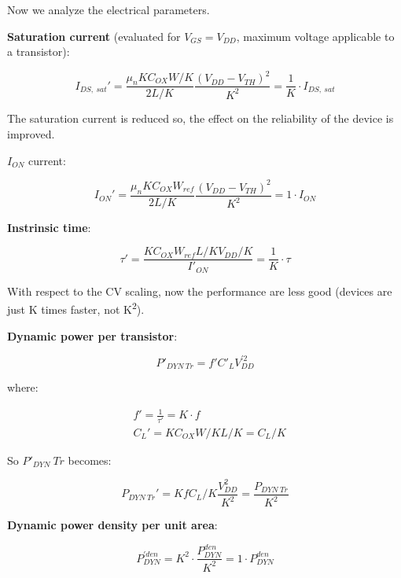 \documentclass[a4paper, 12pt, twoside, openright]{report}
\newcommand{\super}{\textsuperscript}
\begin{document}
{{{Now we analyze the electrical parameters.

\textbf{Saturation current} (evaluated for $V_{GS} = V_{DD}$, maximum voltage applicable to a transistor):

	\begin{equation}
	I_{DS,\ sat}' = \frac{\mu_n K C_{OX} W/K}{2 L/K}\frac{(V_{DD} - V_{TH})^2}{K^2} = \frac{1}{K} \cdot I_{DS,\ sat}
	\label{}
	\end{equation}

The saturation current is reduced so, the effect on the reliability of the device is improved.

$I_{ON}$ current:

	\begin{equation}
	I_{ON}' = \frac{\mu_n K C_{OX} W_{ref}}{2 L/K}\frac{(V_{DD} - V_{TH})^2}{K^2} = 1 \cdot I_{ON}
	\end{equation}

\textbf{Instrinsic time}:

	\begin{equation}
	\tau ' = \frac{K C_{OX} W_{ref} L/K V_{DD}/K}{I'_{ON}} = \frac{1}{K} \cdot \tau
	\end{equation}

With respect to the CV scaling, now the performance are less good (devices are just K times faster, not K\super{2}).

\textbf{Dynamic power per transistor}:

	\begin{equation}
	P'_{DYN \ Tr} =f' C'_L V_{DD}^{'2}
	\end{equation}

where:

	\begin{align}
	&f' = \frac{1}{\tau'} = K \cdot f \\
	&C_L ' = K C_{OX} W/K L/K = C_L/K
	\end{align}

So $P'_{DYN} \ Tr$ becomes:

	\begin{equation}
	P_{DYN \ Tr}' =  K f C_L/K \frac{V_{DD}^2}{K^2} = \frac{P_{DYN \ Tr}}{K^2}
	\end{equation}

\textbf{Dynamic power density per unit area}:

	\begin{equation}
	P^{'den}_{DYN} = K^2 \cdot \frac{P^{den}_{DYN}}{K^2} = 1 \cdot P^{den}_{DYN}
	\end{equation}

}}}
\end{document}
